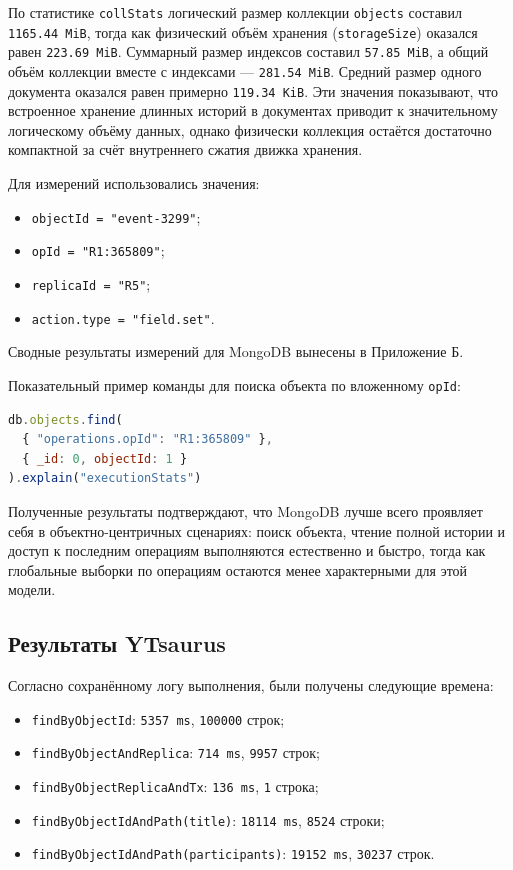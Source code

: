 \documentclass[a4paper,14pt]{extarticle}
\def\makefirstuc#1{#1}%
\def\normalsize{}%
\def\textbf#1{#1}%
\newcommand{\mysubsection}[1]{%
    \subsection{\normalsize\makefirstuc{#1}}
}
\begin{document}
По статистике \texttt{collStats} логический размер коллекции \texttt{objects}
составил \texttt{1165.44 MiB}, тогда как физический объём хранения
(\texttt{storageSize}) оказался равен \texttt{223.69 MiB}. Суммарный размер
индексов составил \texttt{57.85 MiB}, а общий объём коллекции вместе с
индексами --- \texttt{281.54 MiB}. Средний размер одного документа оказался
равен примерно \texttt{119.34 KiB}. Эти значения показывают, что встроенное
хранение длинных историй в документах приводит к значительному логическому
объёму данных, однако физически коллекция остаётся достаточно компактной за
счёт внутреннего сжатия движка хранения.

Для измерений использовались значения:
\begin{itemize}[leftmargin=1.25cm]
    \item \texttt{objectId = "event-3299"};
    \item \texttt{opId = "R1:365809"};
    \item \texttt{replicaId = "R5"};
    \item \texttt{action.type = "field.set"}.
\end{itemize}

Сводные результаты измерений для MongoDB вынесены в
\textbf{Приложение Б}.

Показательный пример команды для поиска объекта по вложенному \texttt{opId}:

\begin{lstlisting}[language=JavaScript,caption={Пример explain("executionStats") для MongoDB}]
db.objects.find(
  { "operations.opId": "R1:365809" },
  { _id: 0, objectId: 1 }
).explain("executionStats")
\end{lstlisting}

Полученные результаты подтверждают, что MongoDB лучше всего проявляет себя в
объектно-центричных сценариях: поиск объекта, чтение полной истории и доступ к
последним операциям выполняются естественно и быстро, тогда как глобальные
выборки по операциям остаются менее характерными для этой модели.

\mysubsection{Результаты YTsaurus}

Согласно сохранённому логу выполнения, были получены следующие времена:
\begin{itemize}[leftmargin=1.25cm]
    \item \texttt{findByObjectId}: \texttt{5357 ms}, \texttt{100000} строк;
    \item \texttt{findByObjectAndReplica}: \texttt{714 ms}, \texttt{9957} строк;
    \item \texttt{findByObjectReplicaAndTx}: \texttt{136 ms}, \texttt{1} строка;
    \item \texttt{findByObjectIdAndPath(title)}: \texttt{18114 ms}, \texttt{8524} строки;
    \item \texttt{findByObjectIdAndPath(participants)}: \texttt{19152 ms}, \texttt{30237} строк.
\end{itemize}
\end{document}
